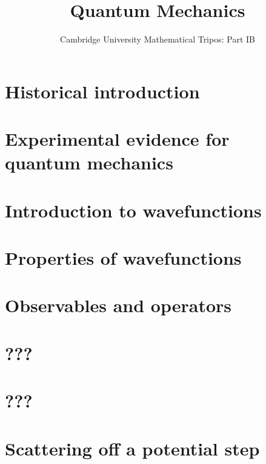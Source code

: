 \documentclass{article}
\title{Quantum Mechanics}
\author{Cambridge University Mathematical Tripos: Part IB}
\begin{document}
\maketitle

\tableofcontentsnewpage{}

\section{Historical introduction}

\section{Experimental evidence for quantum mechanics}

\section{Introduction to wavefunctions}

\section{Properties of wavefunctions}

\section{Observables and operators}

\section{???}

\section{???}

\section{Scattering off a potential step}

\end{document}
